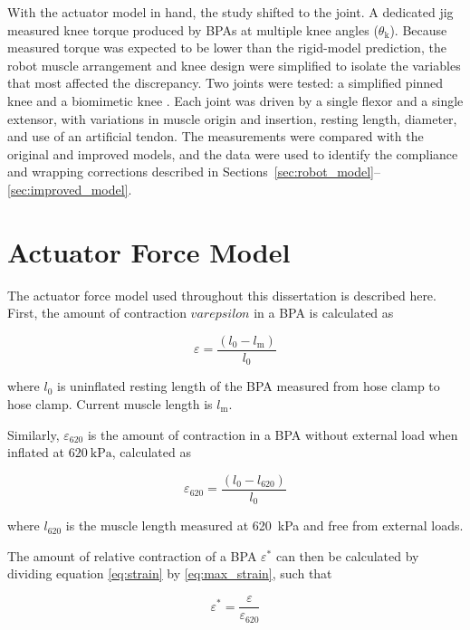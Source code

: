 With the actuator model in hand, the study shifted to the joint. A dedicated jig measured knee torque produced by BPAs at multiple knee angles ($\theta_\text{k}$). Because measured torque was expected to be lower than the rigid-model prediction, the robot muscle arrangement and knee design were simplified to isolate the variables that most affected the discrepancy. Two joints were tested: a simplified pinned knee and a biomimetic knee \citep{steele_biomimetic_2018}. Each joint was driven by a single flexor and a single extensor, with variations in muscle origin and insertion, resting length, diameter, and use of an artificial tendon. The measurements were compared with the original and improved models, and the data were used to identify the compliance and wrapping corrections described in Sections~\ref{sec:robot_model}--\ref{sec:improved_model}.

\section{Actuator Force Model}\label{sec:force_model}


The actuator force model used throughout this dissertation is described here. First, the amount of contraction ${varepsilon}$ in a BPA is calculated as

\begin{equation}
    {\varepsilon} = \frac{(l_{0}-l_\text{m})}{l_{0}} \label{eq:strain}
\end{equation}

where $l_{0}$ is uninflated resting length of the BPA measured from hose clamp to hose clamp. Current muscle length is $l_\text{m}$.

Similarly, ${\varepsilon_{620}}$ is the amount of contraction in a BPA without external load when inflated at $\qty{620}{\kPa}$, calculated as 

\begin{equation}
    \varepsilon_{620} = \frac{(l_{0}-l_{620})}{l_{0}} \label{eq:max_strain}
\end{equation}

where $l_{620}$ is the muscle length measured at \qty{620}{\kPa} and free from external loads. 

The amount of relative contraction of a BPA $\varepsilon^*$ can then be calculated by dividing equation \eqref{eq:strain} by \eqref{eq:max_strain}, such that

\begin{equation}
    \varepsilon^* = \frac{\varepsilon}{\varepsilon_{620}} \label{eq:rel_strain}
\end{equation}

